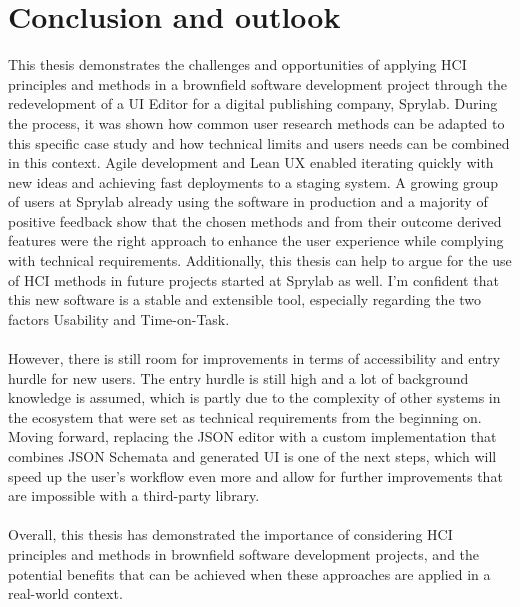 %
\chapter{Conclusion and outlook}
\label{chap:conclusion}      
This thesis demonstrates the challenges and opportunities of applying HCI principles and methods in a brownfield software development project through the redevelopment of a UI Editor for a digital publishing company, Sprylab.
During the process, it was shown how common user research methods can be adapted to this specific case study and how technical limits and users needs can be combined in this context.
Agile development and Lean UX enabled iterating quickly with new ideas and achieving fast deployments to a staging system.
A growing group of users at Sprylab already using the software in production and a majority of positive feedback show that the chosen methods and from their outcome derived features were the right approach to enhance the user experience while complying with technical requirements.
Additionally, this thesis can help to argue for the use of HCI methods in future projects started at Sprylab as well.
I'm confident that this new software is a stable and extensible tool, especially regarding the two factors Usability and Time-on-Task.
\\\\
However, there is still room for improvements in terms of accessibility and entry hurdle for new users.
The entry hurdle is still high and a lot of background knowledge is assumed, which is partly due to the complexity of other systems in the ecosystem that were set as technical requirements from the beginning on.
Moving forward, replacing the JSON editor with a custom implementation that combines JSON Schemata and generated UI is one of the next steps, which will speed up the user's
workflow even more and allow for further improvements that are impossible with a third-party library.
\\\\
Overall, this thesis has demonstrated the importance of considering HCI principles and methods in brownfield software development projects, and the potential benefits that can be achieved when these approaches are applied in a real-world context.